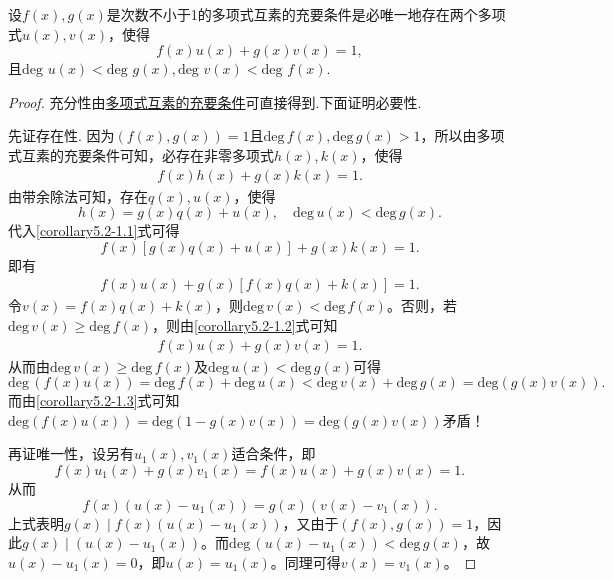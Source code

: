\documentclass[../../main.tex]{subfiles}
\begin{document}
\begin{corollary}\label{corollary:次数不小于1的多项式互素的充要条件}
设\(f(x),g(x)\)是次数不小于1的多项式互素的充要条件是必唯一地存在两个多项式\(u(x),v(x)\)，使得
\[
f(x)u(x)+g(x)v(x)=1,
\]
且\(\text{deg }u(x)<\text{deg }g(x),\text{deg }v(x)<\text{deg }f(x)\).
\end{corollary}
\begin{proof}
充分性由\hyperref[theorem:多项式互素的充要条件]{多项式互素的充要条件}可直接得到.下面证明必要性.

先证存在性.
因为\(( f(x),g(x) ) = 1\)且\(\mathrm{deg}\,f(x),\mathrm{deg}\,g(x) > 1\)，所以由多项式互素的充要条件可知，必存在非零多项式\(h(x),k(x)\)，使得
\begin{align}
f(x)h(x)+g(x)k(x)=1. \label{corollary5.2-1.1} 
\end{align}
由带余除法可知，存在\(q(x),u(x)\)，使得
\[
h(x)=g(x)q(x)+u(x),\quad \mathrm{deg}\,u(x)<\mathrm{deg}\,g(x).
\]
代入\eqref{corollary5.2-1.1}式可得
\[
f(x)[g(x)q(x)+u(x)]+g(x)k(x)=1.
\]
即有
\begin{align}
f(x)u(x)+g(x)[f(x)q(x)+k(x)] = 1. \label{corollary5.2-1.2}  
\end{align}
令\(v(x)=f(x)q(x)+k(x)\)，则\(\mathrm{deg}\,v(x)<\mathrm{deg}\,f(x)\)。否则，若\(\mathrm{deg}\,v(x)\geqslant \mathrm{deg}\,f(x)\)，则由\eqref{corollary5.2-1.2}式可知
\begin{align}
f(x)u(x)+g(x)v(x)=1. \label{corollary5.2-1.3}  
\end{align}
从而由\(\mathrm{deg}\,v(x)\geqslant \mathrm{deg}\,f(x)\)及\(\mathrm{deg}\,u(x)<\mathrm{deg}\,g(x)\)可得
\[
\mathrm{deg}\,(f(x)u(x))=\mathrm{deg}\,f(x)+\mathrm{deg}\,u(x)<\mathrm{deg}\,v(x)+\mathrm{deg}\,g(x)=\mathrm{deg}(g(x)v(x)).
\]
而由\eqref{corollary5.2-1.3}式可知\(\mathrm{deg}\left( f\left( x \right) u\left( x \right) \right) =\mathrm{deg}\left( 1-g\left( x \right) v\left( x \right) \right) =\mathrm{deg}\left( g\left( x \right) v\left( x \right) \right) \)矛盾！

再证唯一性，设另有\(u_1(x),v_1(x)\)适合条件，即
\[
f(x)u_1(x)+g(x)v_1(x)=f(x)u(x)+g(x)v(x)=1.
\]
从而
\[
f(x)(u(x)-u_1(x))=g(x)(v(x)-v_1(x)).
\]
上式表明\(g(x)\mid f(x)(u(x)-u_1(x))\)，又由于\(( f(x),g(x) ) = 1\)，因此\(g(x)\mid (u(x)-u_1(x))\)。而\(\mathrm{deg}\,(u(x)-u_1(x))<\mathrm{deg}\,g(x)\)，故\(u(x)-u_1(x)=0\)，即\(u(x)=u_1(x)\)。同理可得\(v(x)=v_1(x)\)。
\end{proof}
\end{document}
